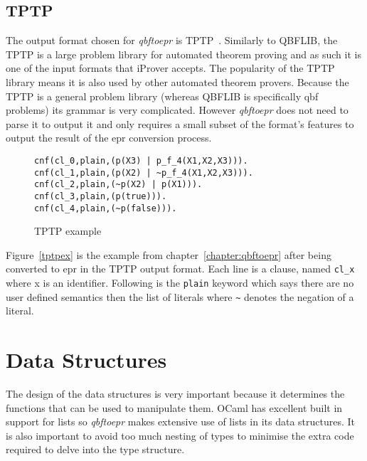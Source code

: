 \subsection{TPTP}
The output format chosen for \textit{qbftoepr} is TPTP~\cite{tptp}. Similarly to QBFLIB, the TPTP is a large problem library for automated theorem proving and as such it is one of the input formats that iProver accepts. The popularity of the TPTP library means it is also used by other automated theorem provers. Because the TPTP is a general problem library (whereas QBFLIB is specifically \gls{qbf} problems) its grammar is very complicated. However \textit{qbftoepr} does not need to parse it to output it and only requires a small subset of the format's features to output the result of the \gls{epr} conversion process.

\begin{figure}
\caption{TPTP example}
\begin{CenteredBox}
\begin{lstlisting}[label=tptpex]
cnf(cl_0,plain,(p(X3) | p_f_4(X1,X2,X3))).
cnf(cl_1,plain,(p(X2) | ~p_f_4(X1,X2,X3))).
cnf(cl_2,plain,(~p(X2) | p(X1))).
cnf(cl_3,plain,(p(true))).
cnf(cl_4,plain,(~p(false))).
\end{lstlisting}
\end{CenteredBox}
\end{figure}
Figure~\ref{tptpex} is the example from chapter~\ref{chapter:qbftoepr} after being converted to \gls{epr} in the TPTP output format. Each line is a clause, named \texttt{cl\_x} where x is an identifier. Following is the \texttt{plain} keyword which says there are no user defined semantics then the list of literals where \texttt{\textasciitilde} denotes the negation of a literal.

\section{Data Structures}
The design of the data structures is very important because it determines the functions that can be used to manipulate them. OCaml has excellent built in support for lists so \textit{qbftoepr} makes extensive use of lists in its data structures. It is also important to avoid too much nesting of types to minimise the extra code required to delve into the type structure.

